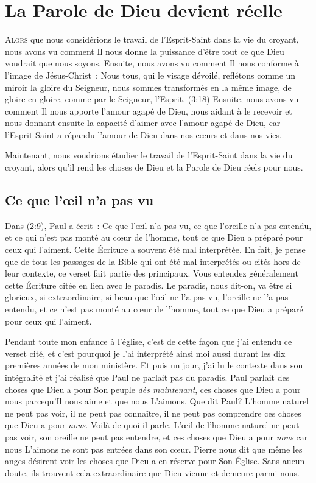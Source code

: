 \chapter{La Parole de Dieu devient r\'eelle}

\lettrine{A}{lors} que nous considérions
 le travail de l'Esprit-Saint
 dans la vie du croyant, nous avons vu comment Il nous donne la puissance
 d'être tout ce que Dieu voudrait que nous soyons.
 Ensuite, nous avons vu comment Il nous conforme à l'image de Jésus-Christ~:
 \og Nous tous, qui le visage dévoilé, reflétons comme un miroir la gloire
 du Seigneur, nous sommes transformés en la même image, de gloire en gloire,
 comme par le Seigneur, l'Esprit. \fg{}
 (3:18)
 Ensuite, nous avons vu comment Il nous apporte l'amour agapé de Dieu,
 nous aidant à le recevoir et nous donnant ensuite la capacité d'aimer
 avec l'amour agapé de Dieu, car l'Esprit-Saint a répandu l'amour de Dieu
 dans nos cœurs et dans nos vies.

Maintenant, nous voudrions étudier le travail de l'Esprit-Saint dans la vie
 du croyant, alors qu'il rend les choses de Dieu et la Parole de Dieu
 réels pour nous.


\section*{Ce que l'œil n'a pas vu}

Dans (2:9), Paul a écrit~:
 \og Ce que l'œil n'a pas vu, ce que l'oreille n'a pas entendu,
 et ce qui n'est pas monté au cœur de l'homme, tout ce que Dieu
 a préparé pour ceux qui l'aiment. \fg{}
 Cette Écriture a souvent été mal interprétée. En fait,
 je pense que de tous les passages de la Bible qui ont été mal interprétés
 ou cités hors de leur contexte, ce verset fait partie des principaux.
 Vous entendez généralement cette Écriture citée en lien avec le paradis.
 Le paradis, nous dit-on, va être si glorieux, si extraordinaire,
 si beau que \og l'œil ne l'a pas vu, l'oreille ne l'a pas entendu,
 et ce n'est pas monté au cœur de l'homme, tout ce que Dieu a préparé
 pour ceux qui l'aiment. \fg{}

Pendant toute mon enfance à l'église, c'est de cette façon que j'ai entendu
 ce verset cité, et c'est pourquoi je l'ai interprété ainsi moi aussi
 durant les dix premières années de mon ministère.
 Et puis un jour, j'ai lu le contexte dans son intégralité et j'ai réalisé
 que Paul ne parlait pas du paradis. Paul parlait des choses que Dieu
 a pour Son peuple \emph{dès maintenant},
 ces choses que Dieu a pour nous parcequ'Il
 nous aime et que nous L'aimons. Que dit Paul?
 L'homme naturel ne peut pas voir, il ne peut pas connaître,
 il ne peut pas comprendre ces choses que Dieu a pour \emph{nous}.
 Voilà de quoi il parle. L'œil de l'homme naturel ne peut pas voir,
 son oreille ne peut pas entendre, et ces choses que Dieu a pour \emph{nous}
 car nous L'aimons ne sont pas entrées dans son cœur.
 Pierre nous dit que même les anges désirent voir les choses que Dieu
 a en réserve pour Son Église.
 Sans aucun doute, ils trouvent cela extraordinaire que Dieu vienne
 et demeure parmi nous.

